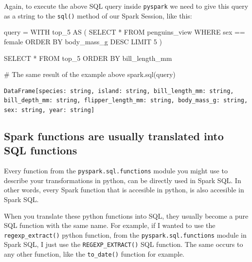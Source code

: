 \documentclass[
  11pt,
  letterpaper,
  DIV=11,
  numbers=noendperiod]{scrreprt}
\newenvironment{Shaded}{\begin{snugshade}}{\end{snugshade}}
\newcommand{\CommentTok}[1]{\textcolor[rgb]{0.37,0.37,0.37}{#1}}
\newcommand{\NormalTok}[1]{\textcolor[rgb]{0.00,0.23,0.31}{#1}}
\newcommand{\OperatorTok}[1]{\textcolor[rgb]{0.37,0.37,0.37}{#1}}
\newcommand{\StringTok}[1]{\textcolor[rgb]{0.13,0.47,0.30}{#1}}
\begin{document}
Again, to execute the above SQL query inside \texttt{pyspark} we need to
give this query as a string to the \texttt{sql()} method of our Spark
Session, like this:

\begin{Shaded}
\begin{Highlighting}[]
\NormalTok{query }\OperatorTok{=} \StringTok{\textquotesingle{}\textquotesingle{}\textquotesingle{}}
\StringTok{WITH top\_5 AS (}
\StringTok{    SELECT *}
\StringTok{    FROM penguins\_view}
\StringTok{    WHERE sex == \textquotesingle{}female\textquotesingle{}}
\StringTok{    ORDER BY body\_mass\_g DESC}
\StringTok{    LIMIT 5}
\StringTok{)}

\StringTok{SELECT *}
\StringTok{FROM top\_5}
\StringTok{ORDER BY bill\_length\_mm}
\StringTok{\textquotesingle{}\textquotesingle{}\textquotesingle{}}

\CommentTok{\# The same result of the example above}
\NormalTok{spark.sql(query)}
\end{Highlighting}
\end{Shaded}

\begin{verbatim}
DataFrame[species: string, island: string, bill_length_mm: string, bill_depth_mm: string, flipper_length_mm: string, body_mass_g: string, sex: string, year: string]
\end{verbatim}

\hypertarget{spark-functions-are-usually-translated-into-sql-functions}{%
\subsection{Spark functions are usually translated into SQL
functions}\label{spark-functions-are-usually-translated-into-sql-functions}}

Every function from the \texttt{pyspark.sql.functions} module you might
use to describe your transformations in python, can be directly used in
Spark SQL. In other words, every Spark function that is accesible in
python, is also accesible in Spark SQL.

When you translate these python functions into SQL, they usually become
a pure SQL function with the same name. For example, if I wanted to use
the \texttt{regexp\_extract()} python function, from the
\texttt{pyspark.sql.functions} module in Spark SQL, I just use the
\texttt{REGEXP\_EXTRACT()} SQL function. The same occurs to any other
function, like the \texttt{to\_date()} function for example.
\end{document}
